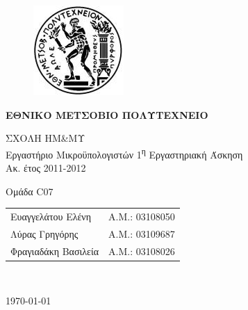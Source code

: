 \begin{titlepage}
\begin{center}
\begin{figure}[t] 
     \includegraphics[scale=0.7]{title/ntua_logo}
\end{figure}
\begin{LARGE}\textbf{ΕΘΝΙΚΟ ΜΕΤΣΟΒΙΟ ΠΟΛΥΤΕΧΝΕΙΟ\\}\end{LARGE}
\vspace{2cm}
\begin{Large}
ΣΧΟΛΗ ΗΜ\&ΜΥ\\
Εργαστήριο Μικροϋπολογιστών
1\textsuperscript{η} Εργαστηριακή Άσκηση\\
Ακ. έτος 2011-2012\\
\end{Large}
\vspace{5cm}
\Large Ομάδα C07\\
\vspace{1cm}
\begin{tabular}{l r}
\Large{Ευαγγελάτου Ελένη}&
\large{Α.Μ.: 03108050}\\
\Large{Λύρας Γρηγόρης}&
\large{Α.Μ.: 03109687}\\
\Large{Φραγιαδάκη Βασιλεία}&
\large{Α.Μ.: 03108026}\\
\end{tabular}\\
\vspace{5cm}

\vfill
\large\today\\
\end{center}
\end{titlepage}

